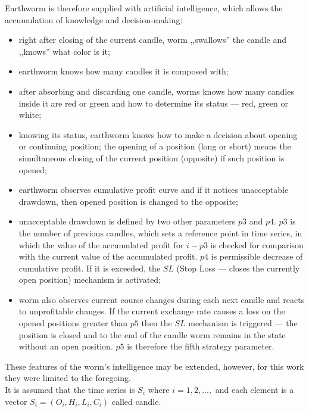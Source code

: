 \documentclass[runningheads,a4paper]{llncs}
\begin{document}
Earthworm is therefore supplied with artificial intelligence, which allows the accumulation of knowledge and decision-making:
\begin{itemize}
\item right after closing of the current candle, worm ,,swallows'' the candle and ,,knows'' what color is it;
\item earthworm knows how many candles it is composed with;
\item after absorbing and discarding one candle, worms knows how many candles inside it are red or green and how to determine its status --- red, green or white;
\item knowing its status, earthworm knows how to make a decision about opening or continuing position; the opening of a position (long or short) means the simultaneous closing of the current position (opposite) if such position is opened;
\item earthworm observes cumulative profit curve and if it  notices unacceptable drawdown, then opened position is changed to the opposite;
\item unacceptable drawdown is defined by two other parameters $p3$ and $p4$. $p3$ is the number of previous candles, which sets a reference point in time series, in which the value of the accumulated profit for $i-p3$ is checked for comparison with the current value of the accumulated profit. $p4$ is permissible decrease of cumulative profit. If it is exceeded, the $SL$ (Stop Loss --- closes the currently open position) mechanism is activated;
\item worm also observes current course changes during  each next candle and reacts to unprofitable changes. If the current exchange rate causes a loss on the opened positions greater than $p5$ then the $SL$ mechanism is triggered --- the position is closed and to the end of the candle worm remains in the state without an open position. $p5$ is therefore the fifth strategy parameter. 
\end{itemize}

These features of the worm's intelligence may be extended, however, for this work they were limited to the foregoing. \\

It is assumed that the time series is $S_i$ where $i = 1, 2, ...,$ and each element is a vector $S_i = (O_i, H_i, L_i, C_i)$ called candle.\\
\end{document}
